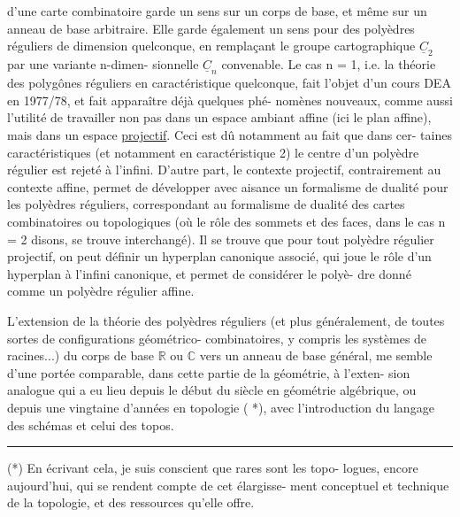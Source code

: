
d'une carte combinatoire garde un sens sur un corps de base, et
même sur un anneau de base arbitraire. Elle garde également un
sens pour des polyèdres réguliers de dimension quelconque, en
remplaçant le groupe cartographique $\underline{C}_2$ par une variante n-dimen-%
sionnelle $\underline{C}_n$ convenable. Le cas n = 1, i.e. la théorie des
polygônes réguliers en caractéristique quelconque, fait l'objet
d'un cours DEA en 1977/78, et fait apparaître déjà quelques phé-%
nomènes nouveaux, comme aussi l'utilité de travailler non pas
dans un espace ambiant affine (ici le plan affine), mais dans
un espace \uline{projectif}. Ceci est dû notamment au fait que dans cer-%
taines caractéristiques (et notamment en caractéristique 2) le
centre d'un polyèdre régulier est rejeté à l'infini. D'autre
part, le contexte projectif, contrairement au contexte affine,
permet de développer avec aisance un formalisme de dualité pour
les polyèdres réguliers, correspondant au formalisme de dualité
des cartes combinatoires ou topologiques (où le rôle des sommets
et des faces, dans le cas n = 2 disons, se trouve interchangé).
Il se trouve que pour tout polyèdre régulier projectif, on peut
définir un hyperplan canonique associé, qui joue le rôle d'un
hyperplan à l'infini canonique, et permet de considérer le polyè-%
dre donné comme un polyèdre régulier affine.

L'extension de la théorie des polyèdres réguliers (et
plus généralement, de toutes sortes de configurations géométrico-%
combinatoires, y compris les systèmes de racines...) du corps de
base $\mathbb{R}$ ou $\mathbb{C}$ vers un anneau de base général, me semble d'une
portée comparable, dans cette partie de la géométrie, à l'exten-%
sion analogue qui a eu lieu depuis le début du siècle en géométrie
algébrique, ou depuis une vingtaine d'années en topologie ( *),
avec l'introduction du langage des schémas et celui des topos.

\rule{4cm}{0.4pt}

(*) En écrivant cela, je suis conscient que rares sont les topo-%
logues, encore aujourd'hui, qui se rendent compte de cet élargisse-%
ment conceptuel et technique de la topologie, et des ressources
qu'elle offre.

